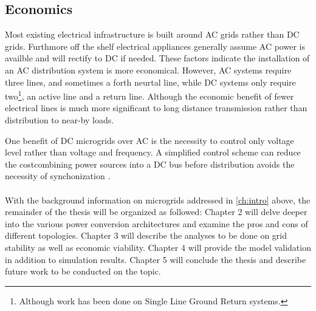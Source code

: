 \subsection{Economics}
Most existing electrical infrastructure is built around AC grids rather than DC grids. Furthmore off the shelf electrical appliances generally assume AC power is availble and will rectify to DC if needed. These factors indicate the installation of an AC distribution system is more economical. However, AC systems require three lines, and sometimes a forth neurtal line, while DC systems only require two\footnote{Although work has been done on Single Line Ground Return systems.}, an active line and a return line. Although the economic benefit of fewer electrical lines is much more significant to long distance transmission rather than distribution to near-by loads.

One benefit of DC microgrids over AC is the necessity to control only voltage level rather than voltage and frequency. A simplified control scheme can reduce the costcombining power sources into a DC bus before distribution avoids the necessity of synchonization \cite{Lotfi2015}.

\paragraph{}
With the background information on microgrids addressed in \autoref{ch:intro} above, the remainder of the thesis will be organized as followed: Chapter 2 will delve deeper into the various power conversion architectures and examine the pros and cons of different topologies. Chapter 3 will describe the analyses to be done on grid stability as well as economic viability. Chapter 4 will provide the model validation in addition to simulation results. Chapter 5 will conclude the thesis and describe future work to be conducted on the topic.

